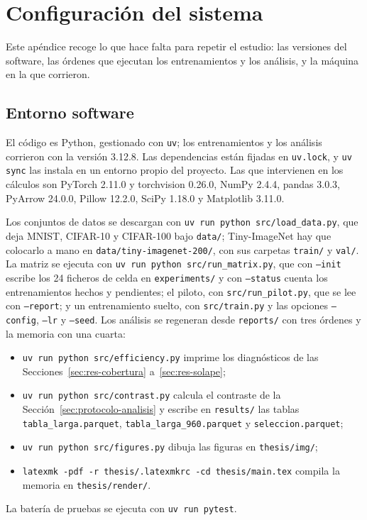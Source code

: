 \chapter{Configuración del sistema}
\label{ap:configuracion}

Este apéndice recoge lo que hace falta para repetir el estudio: las versiones del software, las órdenes que ejecutan los entrenamientos y los análisis, y la máquina en la que corrieron.

\section{Entorno software}
\label{sec:entorno}

El código es Python, gestionado con \texttt{uv}; los entrenamientos y los análisis corrieron con la versión 3.12.8. Las dependencias están fijadas en \texttt{uv.lock}, y \texttt{uv sync} las instala en un entorno propio del proyecto. Las que intervienen en los cálculos son PyTorch 2.11.0 y torchvision 0.26.0, NumPy 2.4.4, pandas 3.0.3, PyArrow 24.0.0, Pillow 12.2.0, SciPy 1.18.0 y Matplotlib 3.11.0.

Los conjuntos de datos se descargan con \texttt{uv run python src/load\_data.py}, que deja MNIST, CIFAR-10 y CIFAR-100 bajo \texttt{data/}; Tiny-ImageNet hay que colocarlo a mano en \texttt{data/tiny-imagenet-200/}, con sus carpetas \texttt{train/} y \texttt{val/}. La matriz se ejecuta con \texttt{uv run python src/run\_matrix.py}, que con \texttt{--init} escribe los 24 ficheros de celda en \texttt{experiments/} y con \texttt{--status} cuenta los entrenamientos hechos y pendientes; el piloto, con \texttt{src/run\_pilot.py}, que se lee con \texttt{--report}; y un entrenamiento suelto, con \texttt{src/train.py} y las opciones \texttt{--config}, \texttt{--lr} y \texttt{--seed}. Los análisis se regeneran desde \texttt{reports/} con tres órdenes y la memoria con una cuarta:
\begin{itemize}
\item \texttt{uv run python src/efficiency.py} imprime los diagnósticos de las Secciones~\ref{sec:res-cobertura} a~\ref{sec:res-solape};
\item \texttt{uv run python src/contrast.py} calcula el contraste de la Sección~\ref{sec:protocolo-analisis} y escribe en \texttt{results/} las tablas \texttt{tabla\_larga.parquet}, \texttt{tabla\_larga\_960.parquet} y \texttt{seleccion.parquet};
\item \texttt{uv run python src/figures.py} dibuja las figuras en \texttt{thesis/img/};
\item \texttt{latexmk -pdf -r thesis/.latexmkrc -cd thesis/main.tex} compila la memoria en \texttt{thesis/render/}.
\end{itemize}
La batería de pruebas se ejecuta con \texttt{uv run pytest}.

